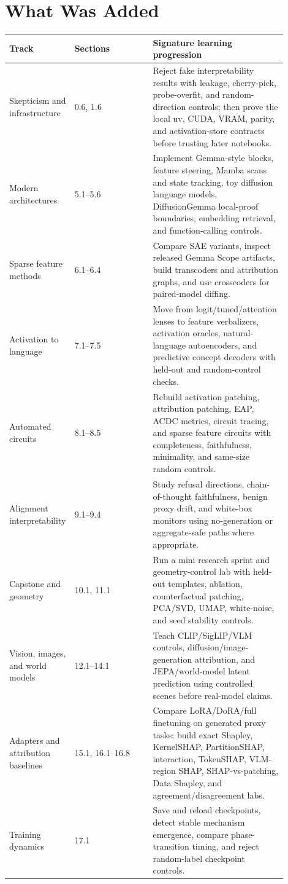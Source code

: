 \documentclass[11pt]{article}
\begin{document}
\section{What Was Added}
\begin{longtable}{@{}p{0.13\linewidth}p{0.29\linewidth}p{0.48\linewidth}@{}}
\toprule
Track & Sections & Signature learning progression \\
\midrule
\endhead
Skepticism and infrastructure &
0.6, 1.6 &
Reject fake interpretability results with leakage, cherry-pick, probe-overfit,
and random-direction controls; then prove the local uv, CUDA, VRAM, parity, and
activation-store contracts before trusting later notebooks. \\
\addlinespace
Modern architectures &
5.1--5.6 &
Implement Gemma-style blocks, feature steering, Mamba scans and state tracking,
toy diffusion language models, DiffusionGemma local-proof boundaries, embedding
retrieval, and function-calling controls. \\
\addlinespace
Sparse feature methods &
6.1--6.4 &
Compare SAE variants, inspect released Gemma Scope artifacts, build transcoders
and attribution graphs, and use crosscoders for paired-model diffing. \\
\addlinespace
Activation to language &
7.1--7.5 &
Move from logit/tuned/attention lenses to feature verbalizers, activation
oracles, natural-language autoencoders, and predictive concept decoders with
held-out and random-control checks. \\
\addlinespace
Automated circuits &
8.1--8.5 &
Rebuild activation patching, attribution patching, EAP, ACDC metrics, circuit
tracing, and sparse feature circuits with completeness, faithfulness,
minimality, and same-size random controls. \\
\addlinespace
Alignment interpretability &
9.1--9.4 &
Study refusal directions, chain-of-thought faithfulness, benign proxy drift,
and white-box monitors using no-generation or aggregate-safe paths where
appropriate. \\
\addlinespace
Capstone and geometry &
10.1, 11.1 &
Run a mini research sprint and geometry-control lab with held-out templates,
ablation, counterfactual patching, PCA/SVD, UMAP, white-noise, and seed
stability controls. \\
\addlinespace
Vision, images, and world models &
12.1--14.1 &
Teach CLIP/SigLIP/VLM controls, diffusion/image-generation attribution, and
JEPA/world-model latent prediction using controlled scenes before real-model
claims. \\
\addlinespace
Adapters and attribution baselines &
15.1, 16.1--16.8 &
Compare LoRA/DoRA/full finetuning on generated proxy tasks; build exact
Shapley, KernelSHAP, PartitionSHAP, interaction, TokenSHAP, VLM-region SHAP,
SHAP-vs-patching, Data Shapley, and agreement/disagreement labs. \\
\addlinespace
Training dynamics &
17.1 &
Save and reload checkpoints, detect stable mechanism emergence, compare
phase-transition timing, and reject random-label checkpoint controls. \\
\bottomrule
\end{longtable}
\end{document}
